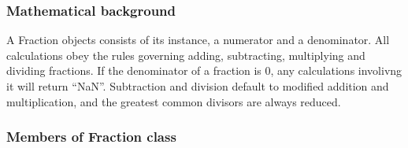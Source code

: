\documentclass[letterpaper,10pt,english]{sphinxmanual}
\begin{document}
\subsubsection{Mathematical background}
\label{\detokenize{fraction:mathematical-background}}
A Fraction objects consists of its instance, a numerator and a denominator.
All calculations obey the rules governing adding, subtracting, multiplying and dividing fractions.
If the denominator of a fraction is 0, any calculations involivng it will return “NaN”.
Subtraction and division default to modified addition and multiplication, and the greatest common divisors are always reduced.


\subsubsection{Members of Fraction class}
\label{\detokenize{fraction:members-of-fraction-class}}\label{\detokenize{fraction:fraction-class}}\label{\detokenize{fraction:module-fraction}}
\end{document}
